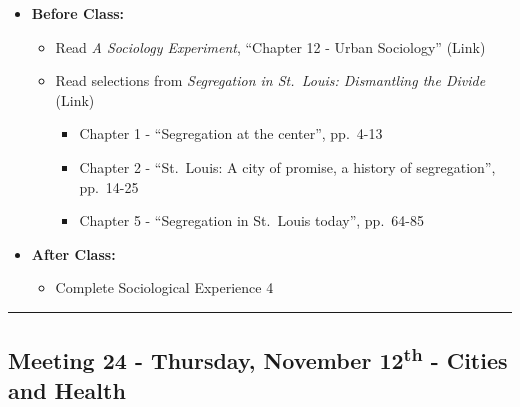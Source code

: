 \documentclass[
]{book}
\providecommand{\tightlist}{%
  \setlength{\itemsep}{0pt}\setlength{\parskip}{0pt}}
\begin{document}
\begin{itemize}
\tightlist
\item
  \textbf{Before Class:}

  \begin{itemize}
  \tightlist
  \item
    Read \emph{A Sociology Experiment}, ``Chapter 12 - Urban Sociology'' (Link)
  \item
    Read selections from \emph{Segregation in St.~Louis: Dismantling the Divide} (Link)

    \begin{itemize}
    \tightlist
    \item
      Chapter 1 - ``Segregation at the center'', pp.~4-13
    \item
      Chapter 2 - ``St.~Louis: A city of promise, a history of segregation'', pp.~14-25
    \item
      Chapter 5 - ``Segregation in St.~Louis today'', pp.~64-85
    \end{itemize}
  \end{itemize}
\item
  \textbf{After Class:}

  \begin{itemize}
  \tightlist
  \item
    Complete Sociological Experience 4
  \end{itemize}
\end{itemize}

\begin{center}\rule{0.5\linewidth}{0.5pt}\end{center}

\hypertarget{meeting-24---thursday-november-12th---cities-and-health}{%
\subsection*{\texorpdfstring{Meeting 24 - Thursday, November 12\textsuperscript{th} - Cities and Health}{Meeting 24 - Thursday, November 12th - Cities and Health}}\label{meeting-24---thursday-november-12th---cities-and-health}}
\end{document}
